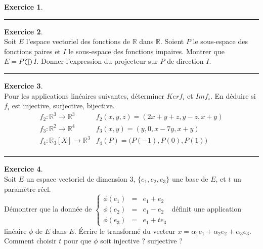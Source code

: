 \documentclass[a4paper,10pt]{article}
\theoremstyle{definition}
\theoremstyle{definition}
\newtheorem{exo}{Exercice}
\newcommand{\R}{\mathbb{R}}
\begin{document}
\begin{minipage}{1\linewidth}
\begin{minipage}[t]{0.48\linewidth}
\begin{exo}
		\centering
		\rule{1\linewidth}{0.6pt}
	\end{exo}


		\begin{exo}\quad\\
		Soit $E$ l'espace vectoriel des fonctions de $\R$ dans $\R$. Soient $P$ le
		sous-espace des fonctions paires et $I$ le sous-espace des fonctions
		impaires. Montrer que $E=P\bigoplus I$. Donner l'expression du projecteur sur
		$P$ de direction $I$.
	
	\centering
	\rule{1\linewidth}{0.6pt}
\end{exo}
	
		
	
	\end{minipage}	
	\hfill\vrule\hfill
	\begin{minipage}[t]{0.48\linewidth}
		\raggedright
		
	\begin{exo}\quad\\
		Pour les applications lin\'eaires suivantes,  d\'eterminer $Ker f_i$ et 
		$Im f_i$. En d\'eduire si $f_i$ est injective, surjective, bijective.
		$$\begin{array}{ll}
		f_2 : \R^3 \to \R^3 & f_2(x,y,z)=(2x+y+z,y-z,x+y) \\
		f_3 : \R^2 \to \R^4 & f_3(x,y)=(y,0,x-7y,x+y) \\
		f_4 : \R_3[X] \to \R^3 & f_4(P) = \big( P(-1), P(0), P(1) \big) \\
		\end{array}
		$$
		
		\centering
		\rule{1\linewidth}{0.6pt}
	\end{exo}
		
	\begin{exo}\quad\\
		 Soit $E$ un espace vectoriel de dimension $3$, $\{e_1,e_2,e_3\}$ une base
		de $E$, et $t$ un param\`etre r\'eel. \\
		D\'emontrer que la donn\'ee de
		$\left\{
		\begin{array}{rcl}
		\phi(e_1) & = & e_1+e_2  \\
		\phi(e_2) & = & e_1-e_2  \\
		\phi(e_3) & = & e_1+t e_3
		\end{array}\right.$
		d\'efinit une application lin\'eaire
		$\phi$ de $E$ dans $E$. \'Ecrire le transform\'e du vecteur 
		$x=\alpha_1e_1+\alpha_2e_2+\alpha_3e_3$. Comment choisir $t$ pour que 
		$\phi$ soit injective ? surjective ?	
		

\end{exo}
\end{minipage}
\end{minipage}
\end{document}

